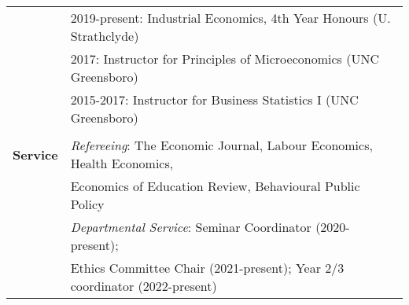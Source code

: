 \documentclass[11pt,a4paper]{article}
\begin{document}
\begin{longtable}{l l}
																												&  2019-present: Industrial Economics, 4th Year Honours (U. Strathclyde)  \\
																												&  2017: Instructor for Principles of Microeconomics  (UNC Greensboro)  \\
																												&  2015-2017: Instructor for Business Statistics I  (UNC Greensboro)   \\
																												&  \\
\textbf{Service}							 								&  \textit{Refereeing}: The Economic Journal, Labour Economics, Health Economics,  \\
																												&  Economics of Education Review, Behavioural Public Policy  \\
\addlinespace
																												&  \textit{Departmental Service}: Seminar Coordinator (2020-present);  \\
																												&  Ethics Committee Chair (2021-present); Year 2/3 coordinator (2022-present)  \\ 																								
\end{longtable}






\end{document}
